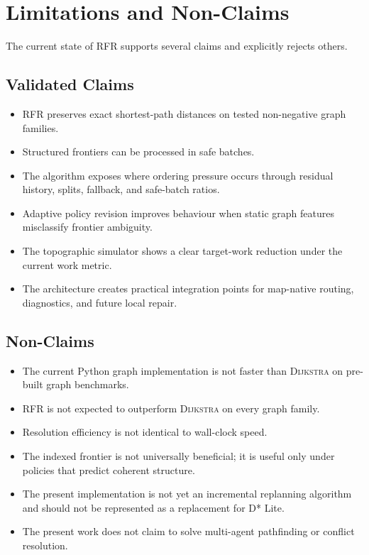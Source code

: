 \documentclass[11pt]{article}
\newcommand{\RFR}{\textsc{RFR}}
\newcommand{\Dijkstra}{\textsc{Dijkstra}}
\begin{document}
\section{Limitations and Non-Claims}
\label{sec:limitations}

The current state of \RFR{} supports several claims and explicitly rejects others.

\subsection{Validated Claims}

\begin{itemize}
  \item \RFR{} preserves exact shortest-path distances on tested non-negative graph families.
  \item Structured frontiers can be processed in safe batches.
  \item The algorithm exposes where ordering pressure occurs through residual history, splits, fallback, and safe-batch ratios.
  \item Adaptive policy revision improves behaviour when static graph features misclassify frontier ambiguity.
  \item The topographic simulator shows a clear target-work reduction under the current work metric.
  \item The architecture creates practical integration points for map-native routing, diagnostics, and future local repair.
\end{itemize}

\subsection{Non-Claims}

\begin{itemize}
  \item The current Python graph implementation is not faster than \Dijkstra{} on pre-built graph benchmarks.
  \item \RFR{} is not expected to outperform \Dijkstra{} on every graph family.
  \item Resolution efficiency is not identical to wall-clock speed.
  \item The indexed frontier is not universally beneficial; it is useful only under policies that predict coherent structure.
  \item The present implementation is not yet an incremental replanning algorithm and should not be represented as a replacement for D* Lite.
  \item The present work does not claim to solve multi-agent pathfinding or conflict resolution.
\end{itemize}
\end{document}
